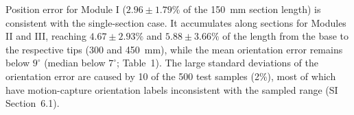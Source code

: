 Position error for Module I ($2.96 \pm 1.79\%$ of the 150~mm section length) is consistent with the single-section case. It accumulates along sections for Modules II and III, reaching $4.67 \pm 2.93\%$ and $5.88 \pm 3.66\%$ of the length from the base to the respective tips (300 and 450~mm), while the mean orientation error remains below $9^\circ$ (median below $7^\circ$; Table~1). The large standard deviations of the orientation error are caused by 10 of the 500 test samples (2\%), most of which have motion-capture orientation labels inconsistent with the sampled range (SI Section~6.1).
